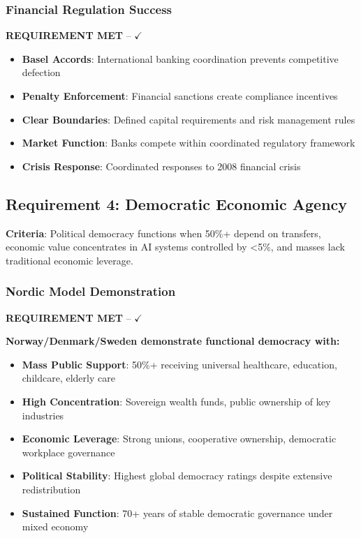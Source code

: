 \documentclass[11pt,a4paper]{article}
\newcommand{\greencheckmark}{{\color{validationgreen}\textbf{$\checkmark$}}}
\newcommand{\requirement}[1]{\textcolor{secondaryblue}{\textbf{#1}}}
\newcommand{\evidence}[1]{\textcolor{validationgreen}{\textbf{#1}}}
\begin{document}
\subsubsection{Financial Regulation Success}

\evidence{REQUIREMENT MET} -- \greencheckmark

\begin{itemize}[leftmargin=*]
\item \textbf{Basel Accords}: International banking coordination prevents competitive defection
\item \textbf{Penalty Enforcement}: Financial sanctions create compliance incentives
\item \textbf{Clear Boundaries}: Defined capital requirements and risk management rules
\item \textbf{Market Function}: Banks compete within coordinated regulatory framework
\item \textbf{Crisis Response}: Coordinated responses to 2008 financial crisis
\end{itemize}

\subsection{Requirement 4: Democratic Economic Agency}

\requirement{Criteria}: Political democracy functions when 50\%+ depend on transfers, economic value concentrates in AI systems controlled by <5\%, and masses lack traditional economic leverage.

\subsubsection{Nordic Model Demonstration}

\evidence{REQUIREMENT MET} -- \greencheckmark

\textbf{Norway/Denmark/Sweden demonstrate functional democracy with:}

\begin{itemize}[leftmargin=*]
\item \textbf{Mass Public Support}: 50\%+ receiving universal healthcare, education, childcare, elderly care
\item \textbf{High Concentration}: Sovereign wealth funds, public ownership of key industries
\item \textbf{Economic Leverage}: Strong unions, cooperative ownership, democratic workplace governance  
\item \textbf{Political Stability}: Highest global democracy ratings despite extensive redistribution
\item \textbf{Sustained Function}: 70+ years of stable democratic governance under mixed economy
\end{itemize}
\end{document}
